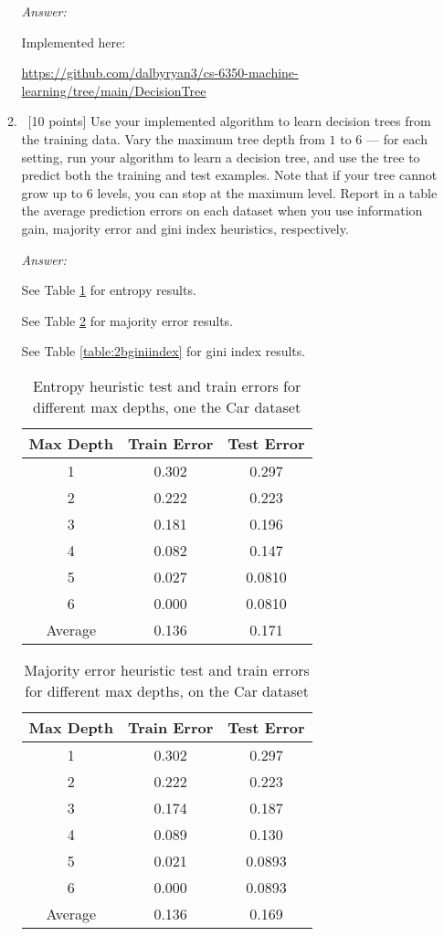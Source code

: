 \documentclass[12pt, fullpage,letterpaper]{article}
\begin{document}
\begin{enumerate}
\begin{enumerate}
\textit{Answer:} 

Implemented here: 

\url{https://github.com/dalbyryan3/cs-6350-machine-learning/tree/main/DecisionTree}


\item~[10 points] Use your implemented algorithm to learn decision trees from the training data. Vary the maximum  tree depth from $1$ to $6$  --- for each setting, run your algorithm to learn a decision tree, and use the tree to  predict both the training  and test examples. Note that if your tree cannot grow up to 6 levels, you can stop at the maximum level. Report in a table the average prediction errors on each dataset when you use information gain, majority error and gini index heuristics, respectively.

\textit{Answer:} 

See Table \ref{table:2bentropy} for entropy results. 

See Table \ref{table:2bmajorityerror} for majority error results. 

See Table \ref{table:2bginiindex} for gini index results. 

\newpage
\begin{table}[ht]
	\centering
	\begin{tabular}{|c|c|c|}
        \hline
		Max Depth & Train Error & Test Error\\ 
		\hline\hline
		1 & 0.302 & 0.297 \\ \hline
		2 & 0.222 & 0.223 \\ \hline
		3 & 0.181 & 0.196 \\ \hline
		4 & 0.082 & 0.147 \\ \hline
		5 & 0.027 & 0.0810 \\ \hline
		6 & 0.000 & 0.0810 \\ \hline
		Average & 0.136 & 0.171 \\ \hline
	\end{tabular}
	\caption{Entropy heuristic test and train errors for different max depths, one the Car dataset}
    \label{table:2bentropy}
\end{table}

\begin{table}[ht]
	\centering
	\begin{tabular}{|c|c|c|}
        \hline
		Max Depth & Train Error & Test Error\\ 
		\hline\hline
		1 & 0.302 & 0.297 \\ \hline
		2 & 0.222 & 0.223 \\ \hline
		3 & 0.174 & 0.187 \\ \hline
		4 & 0.089 & 0.130 \\ \hline
		5 & 0.021 & 0.0893 \\ \hline
		6 & 0.000 & 0.0893 \\ \hline
		Average & 0.136 & 0.169 \\ \hline
	\end{tabular}
	\caption{Majority error heuristic test and train errors for different max depths, on the Car dataset}
    \label{table:2bmajorityerror}
\end{table}


\end{enumerate}
\end{enumerate}
\end{document}
